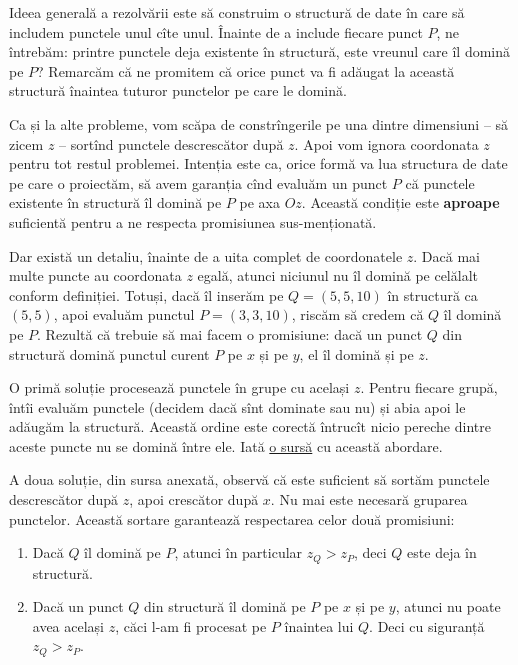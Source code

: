 \documentclass[../main.tex]{subfiles}
\begin{document}
Ideea generală a rezolvării este să construim o structură de date în care să includem punctele unul cîte unul. Înainte de a include fiecare punct $P$, ne întrebăm: printre punctele deja existente în structură, este vreunul care îl domină pe $P$? Remarcăm că ne promitem că orice punct va fi adăugat la această structură înaintea tuturor punctelor pe care le domină.

Ca și la alte probleme, vom scăpa de constrîngerile pe una dintre dimensiuni -- să zicem $z$ -- sortînd punctele descrescător după $z$. Apoi vom ignora coordonata $z$ pentru tot restul problemei. Intenția este ca, orice formă va lua structura de date pe care o proiectăm, să avem garanția cînd evaluăm un punct $P$ că punctele existente în structură îl domină pe $P$ pe axa $Oz$. Această condiție este \textbf{aproape} suficientă pentru a ne respecta promisiunea sus-menționată.

Dar există un detaliu, înainte de a uita complet de coordonatele $z$. Dacă mai multe puncte au coordonata $z$ egală, atunci niciunul nu îl domină pe celălalt conform definiției. Totuși, dacă îl inserăm pe $Q = (5, 5, 10)$ în structură ca $(5, 5)$, apoi evaluăm punctul $P = (3, 3, 10)$, riscăm să credem că $Q$ îl domină pe $P$. Rezultă că trebuie să mai facem o promisiune: dacă un punct $Q$ din structură domină punctul curent $P$ pe $x$ și pe $y$, el îl domină și pe $z$.

O primă soluție procesează punctele în grupe cu același $z$. Pentru fiecare grupă, întîi evaluăm punctele (decidem dacă sînt dominate sau nu) și abia apoi le adăugăm la structură. Această ordine este corectă întrucît nicio pereche dintre aceste puncte nu se domină între ele. Iată \href{https://codeforces.com/contest/12/submission/280419808}{o sursă} cu această abordare.

A doua soluție, din sursa anexată, observă că este suficient să sortăm punctele descrescător după $z$, apoi crescător după $x$. Nu mai este necesară gruparea punctelor. Această sortare garantează respectarea celor două promisiuni:

\begin{enumerate}
  \item Dacă $Q$ îl domină pe $P$, atunci în particular $z_Q > z_P$, deci $Q$ este deja în structură.
  \item Dacă un punct $Q$ din structură îl domină pe $P$ pe $x$ și pe $y$, atunci nu poate avea același $z$, căci l-am fi procesat pe $P$ înaintea lui $Q$. Deci cu siguranță $z_Q > z_P$.
\end{enumerate}
\end{document}
